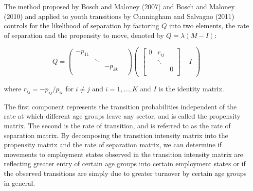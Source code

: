 \documentclass[
  11pt,
a4paper
]{article}
\begin{document}
The method proposed by Bosch and Maloney (2007) and Bosch and Maloney (2010) and applied to youth transitions by Cunningham and Salvagno (2011) controls for the likelihood of separation by
factoring \(Q\) into two elements, the rate of separation and the propensity to move, denoted by \(Q = \lambda(M-I)\):

\singlespacing

\[
Q= \begin{pmatrix}
-p_{11} &  &  &  \\
 & \ddots &  &  \\
 &   & -p_{kk} & \\
\end{pmatrix}
\begin{pmatrix} \begin{bmatrix}
0 &  r_{ij} & \\
 & \ddots &  \\
 &  & 0  \\
\end{bmatrix} - I
\end{pmatrix}
\]
\doublespacing

where \(r_{ij} = -p_{ij}/p_{ii}\) for \(i \neq j\) and \(i = 1, \dots, K\) and \(I\) is the identity matrix.

The first component represents the transition probabilities independent of the rate at which different age groups leave any sector, and is called the propensity matrix. The second is the rate of transition, and is referred to as the rate of separation matrix. By decomposing the transition intensity matrix into the propensity matrix and the rate of separation matrix, we can determine if movements to employment states observed in the transition intensity matrix are reflecting greater entry of certain age groups into certain employment states or if the observed transitions are simply due to greater turnover by certain age groups in general.

\singlespacing
\end{document}
